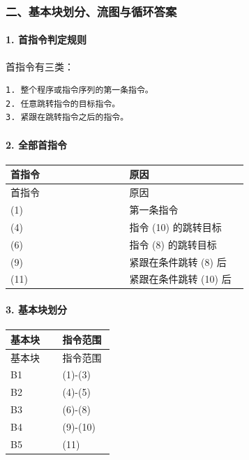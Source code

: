 \documentclass[UTF8]{ctexart}
\begin{document}
\subsubsection*{二、基本块划分、流图与循环答案}

\paragraph*{1. 首指令判定规则}

首指令有三类：

\begin{Verbatim}[fontsize=\small,breaklines=true]
1. 整个程序或指令序列的第一条指令。
2. 任意跳转指令的目标指令。
3. 紧跟在跳转指令之后的指令。
\end{Verbatim}

\paragraph*{2. 全部首指令}

\begin{longtable}{|p{0.47\linewidth}|p{0.47\linewidth}|}
\hline
首指令 & 原因 \\
\hline
\endfirsthead
首指令 & 原因 \\
\hline
\endhead
(1) & 第一条指令 \\
\hline
(4) & 指令 (10) 的跳转目标 \\
\hline
(6) & 指令 (8) 的跳转目标 \\
\hline
(9) & 紧跟在条件跳转 (8) 后 \\
\hline
(11) & 紧跟在条件跳转 (10) 后 \\
\hline
\end{longtable}

\paragraph*{3. 基本块划分}

\begin{longtable}{|p{0.47\linewidth}|p{0.47\linewidth}|}
\hline
基本块 & 指令范围 \\
\hline
\endfirsthead
基本块 & 指令范围 \\
\hline
\endhead
B1 & (1)-(3) \\
\hline
B2 & (4)-(5) \\
\hline
B3 & (6)-(8) \\
\hline
B4 & (9)-(10) \\
\hline
B5 & (11) \\
\hline
\end{longtable}
\end{document}

